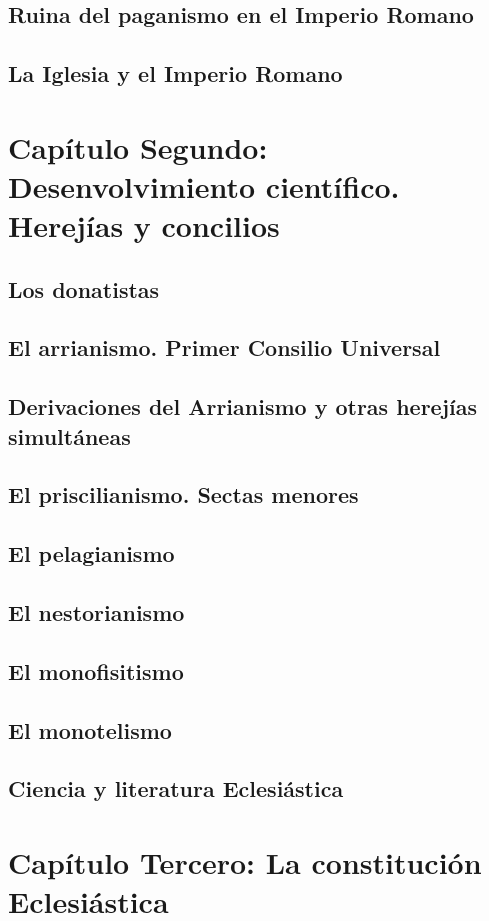 \raggedbottom{} \documentclass[12pt, a4paper, openany]{book} %
\begin{document}
\section{Ruina del paganismo en el Imperio Romano}
\section{La Iglesia y el Imperio Romano}
\chapter{Capítulo Segundo: Desenvolvimiento científico. Herejías y concilios}
\section{Los donatistas}
\section{El arrianismo. Primer Consilio Universal}
\section{Derivaciones del Arrianismo y otras herejías simultáneas}
\section{El priscilianismo. Sectas menores}
\section{El pelagianismo}
\section{El nestorianismo}
\section{El monofisitismo}
\section{El monotelismo}
\section{Ciencia y literatura Eclesiástica}
\chapter{Capítulo Tercero: La constitución Eclesiástica}
\end{document}
